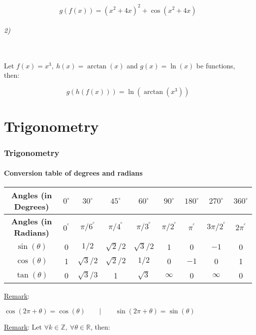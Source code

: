 \documentclass{article}
\newcommand{\figbox}[1]{ 
    \begin{figure*}[ht!]        
        \begin{center}            
            \fbox{#1}        
        \end{center}    
    \end{figure*}
}
\newcommand{\pph}[1]{\paragraph{#1} \phantom{}\\}
\newcommand{\dm}{\displaystyle}
\newcommand{\rad}{^{\mathrm{c}}}
\begin{document}
\[g(f(x))=\left(x^2+4x\right)^2+\cos(x^2+4x)\]

\pph{2)}
Let $f(x)=x^3,\ h(x)=\arctan(x)$ and $g(x)=\ln(x)$ be functions, then:

\[
  g(h(f(x)))=\ln(\arctan(x^3))
\]

\newpage
\part{Trigonometry}
\section{Trigonometry}
\subsection{Conversion table of degrees and radians}
\begin{center}
    \begin{tabular}{|c|c|c|c|c|c|c|c|c|}
        \hline
        \textbf{Angles (in Degrees)} & \rule{0pt}{15pt} $0^\circ$ & $30^\circ$ & $45^\circ$ & $60^\circ$ & $90^\circ$ & $180^\circ$ & $270^\circ$ & $360^\circ$ \\
        \hline
        \textbf{Angles (in Radians)} & \rule{0pt}{15pt} $0^{\rad}$ & $\pi/6^{\rad}$ & $\pi/4^{\rad}$ & $\pi/3^{\rad}$ & $\pi/2^{\rad}$ & $\pi^{\rad}$ & $3\pi/2^{\rad}$ & $2\pi^{\rad}$ \\
        \hline
        $\sin(\theta)$ & \rule{0pt}{15pt} 0 & $1/2$ & $\sqrt{2}/2$ & $\sqrt{3}/2$ & 1 & 0 & $-1$ & 0 \\
        \hline
        $\cos(\theta)$ & \rule{0pt}{15pt} 1 & $\sqrt{3}/2$ & $\sqrt{2}/2$ & $1/2$ & 0 & $-1$ & 0 & 1 \\
        \hline
        $\tan(\theta)$ & \rule{0pt}{15pt} 0 & $\sqrt{3}/3$ & 1 & $\sqrt{3}$ & $\infty$ & 0 & $\infty$ & 0 \\
        \hline
    \end{tabular}
\end{center}
\phantom{}

\underline{Remark}:

\begin{center}
    $\dm \cos(2\pi+\theta) = \cos(\theta) \qquad | \qquad
    \sin(2\pi+\theta) = \sin(\theta)$
\end{center}

\underline{Remark}:
Let $\forall k \in \mathbb{Z},\ \forall \theta \in \mathbb{R}$, then:
\figbox{$\cos(\theta + 2\pi k)=\cos(\theta)$}
\end{document}
